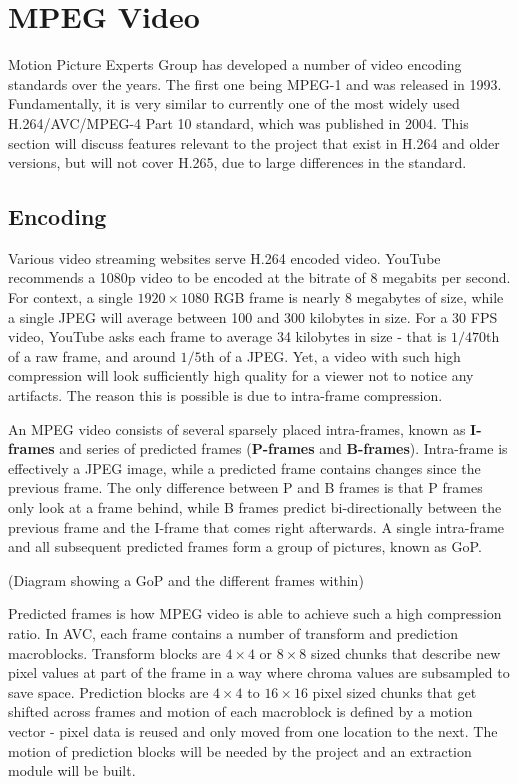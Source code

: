 \documentclass[11pt,english]{report}
\begin{document}
\section{MPEG Video}

Motion Picture Experts Group has developed a number of video encoding standards over the years. The first one being MPEG-1 and was released in 1993. Fundamentally, it is very similar to currently one of the most widely used H.264/AVC/MPEG-4 Part 10 standard, which was published in 2004. This section will discuss features relevant to the project that exist in H.264 and older versions, but will not cover H.265, due to large differences in the standard.

\subsection{Encoding}

Various video streaming websites serve H.264 encoded video. YouTube recommends a 1080p video to be encoded at the bitrate of 8 megabits per second\cite{youtube}. For context, a single $1920 \times 1080$ RGB frame is nearly 8 megabytes of size, while a single JPEG will average between 100 and 300 kilobytes in size. For a 30 FPS video, YouTube asks each frame to average 34 kilobytes in size - that is $1/470$th of a raw frame, and around $1/5$th of a JPEG. Yet, a video with such high compression will look sufficiently high quality for a viewer not to notice any artifacts. The reason this is possible is due to intra-frame compression.

An MPEG video consists of several sparsely placed intra-frames, known as \textbf{I-frames} and series of predicted frames (\textbf{P-frames} and \textbf{B-frames}). Intra-frame is effectively a JPEG image, while a predicted frame contains changes since the previous frame. The only difference between P and B frames is that P frames only look at a frame behind, while B frames predict bi-directionally between the previous frame and the I-frame that comes right afterwards. A single intra-frame and all subsequent predicted frames form a group of pictures, known as GoP.

(Diagram showing a GoP and the different frames within)

Predicted frames is how MPEG video is able to achieve such a high compression ratio. In AVC, each frame contains a number of transform and prediction macroblocks. Transform blocks are $4 \times 4$ or $8 \times 8$ sized chunks that describe new pixel values at part of the frame in a way where chroma values are subsampled to save space. Prediction blocks are $4 \times 4$ to $16 \times 16$ pixel sized chunks that get shifted across frames and motion of each macroblock is defined by a motion vector - pixel data is reused and only moved from one location to the next. The motion of prediction blocks will be needed by the project and an extraction module will be built.
\end{document}
